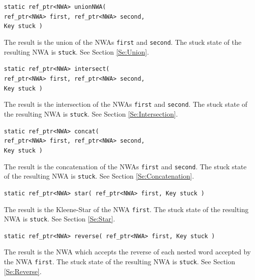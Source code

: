 \documentclass{llncs}
\begin{document}
\begin{description}

  \item\texttt{static ref\_ptr<NWA> unionNWA(  \\ \hspace*{3.25cm} ref\_ptr<NWA> first, ref\_ptr<NWA> second, \\ \hspace*{3.25cm} Key stuck )}

    The result is the union of the NWAs \texttt{first} and \texttt{second}.  The stuck state of the resulting NWA is \texttt{stuck}.  See Section \ref{Se:Union}.  

  \item\texttt{static ref\_ptr<NWA> intersect(  \\ \hspace*{3.25cm} ref\_ptr<NWA> first, ref\_ptr<NWA> second, \\ \hspace*{3.25cm} Key stuck )}

    The result is the intersection of the NWAs \texttt{first} and \texttt{second}.  The stuck state of the resulting NWA is \texttt{stuck}.  See Section \ref{Se:Intersection}.

  \item\texttt{static ref\_ptr<NWA> concat(  \\ \hspace*{3.25cm} ref\_ptr<NWA> first, ref\_ptr<NWA> second, \\ \hspace*{3.25cm} Key stuck )}

    The result is the concatenation of the NWAs \texttt{first} and \texttt{second}.  The stuck state of the resulting NWA is \texttt{stuck}.  See Section \ref{Se:Concatenation}.

  \item\texttt{static ref\_ptr<NWA> star( ref\_ptr<NWA> first, Key stuck )}

    The result is the Kleene-Star of the NWA \texttt{first}.  The stuck state of the resulting NWA is \texttt{stuck}.  See Section \ref{Se:Star}.

  \item\texttt{static ref\_ptr<NWA> reverse( ref\_ptr<NWA> first, Key stuck )}

    The result is the NWA which accepts the reverse of each nested word accepted by the NWA \texttt{first}.  The stuck state of the resulting NWA is \texttt{stuck}.  See Section \ref{Se:Reverse}.


\end{description}
\end{document}
